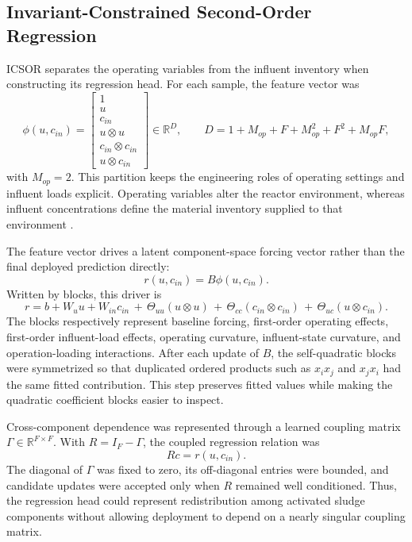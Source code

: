 \documentclass[12pt, twoside]{book}
\begin{document}
\subsection{Invariant-Constrained Second-Order Regression}

ICSOR separates the operating variables from the influent inventory when constructing its regression head.
For each sample, the feature vector was
\begin{equation}
\label{eq:ch3_feature_map}
\phi(u,c_{in})=
\begin{bmatrix}
1\\
u\\
c_{in}\\
u\otimes u\\
c_{in}\otimes c_{in}\\
u\otimes c_{in}
\end{bmatrix}
\in\mathbb{R}^{D},
\qquad
D=1+M_{op}+F+M_{op}^{2}+F^{2}+M_{op}F,
\end{equation}
with \(M_{op}=2\). This partition keeps the engineering roles of operating settings and influent loads
explicit. Operating variables alter the reactor environment, whereas influent concentrations define the
material inventory supplied to that environment \citep{Araujo2013,Machado2014}.

The feature vector drives a latent component-space forcing vector rather than the final deployed prediction
directly:
\begin{equation}
\label{eq:ch3_latent_driver}
r(u,c_{in})=B\phi(u,c_{in}).
\end{equation}
Written by blocks, this driver is
\begin{equation}
\label{eq:ch3_block_driver}
r=b+W_u u+W_{in}c_{in}
\,+\,\Theta_{uu}(u\otimes u)
\,+\,\Theta_{cc}(c_{in}\otimes c_{in})
\,+\,\Theta_{uc}(u\otimes c_{in}).
\end{equation}
The blocks respectively represent baseline forcing, first-order operating effects, first-order influent-load
effects, operating curvature, influent-state curvature, and operation-loading interactions. After each update
of \(B\), the self-quadratic blocks were symmetrized so that duplicated ordered products such as \(x_i x_j\)
and \(x_j x_i\) had the same fitted contribution. This step preserves fitted values while making the
quadratic coefficient blocks easier to inspect.

Cross-component dependence was represented through a learned coupling matrix
\(\Gamma\in\mathbb{R}^{F\times F}\). With \(R=I_F-\Gamma\), the coupled regression relation was
\begin{equation}
\label{eq:ch3_coupled_relation}
Rc=r(u,c_{in}).
\end{equation}
The diagonal of \(\Gamma\) was fixed to zero, its off-diagonal entries were bounded, and candidate updates
were accepted only when \(R\) remained well conditioned. Thus, the regression head could represent
redistribution among activated sludge components without allowing deployment to depend on a nearly singular
coupling matrix.
\end{document}
